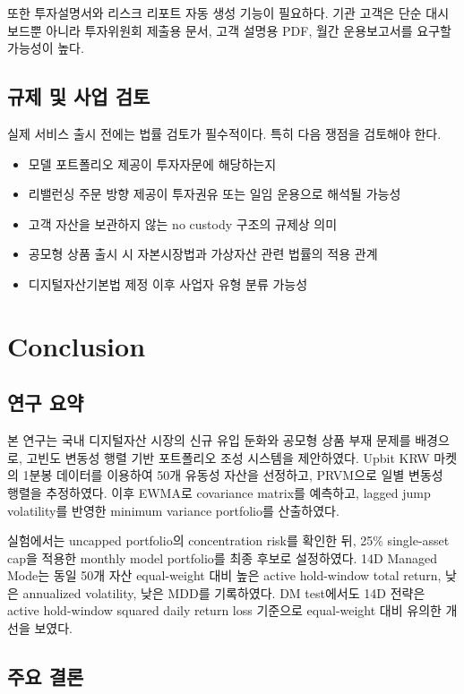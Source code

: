 \documentclass[12pt,a4paper]{article}
\begin{document}
또한 투자설명서와 리스크 리포트 자동 생성 기능이 필요하다. 기관 고객은 단순 대시보드뿐 아니라 투자위원회 제출용 문서, 고객 설명용 PDF, 월간 운용보고서를 요구할 가능성이 높다.

\subsection{규제 및 사업 검토}

실제 서비스 출시 전에는 법률 검토가 필수적이다. 특히 다음 쟁점을 검토해야 한다.

\begin{itemize}
\item 모델 포트폴리오 제공이 투자자문에 해당하는지
\item 리밸런싱 주문 방향 제공이 투자권유 또는 일임 운용으로 해석될 가능성
\item 고객 자산을 보관하지 않는 no custody 구조의 규제상 의미
\item 공모형 상품 출시 시 자본시장법과 가상자산 관련 법률의 적용 관계
\item 디지털자산기본법 제정 이후 사업자 유형 분류 가능성
\end{itemize}


\section{Conclusion}

\subsection{연구 요약}

본 연구는 국내 디지털자산 시장의 신규 유입 둔화와 공모형 상품 부재 문제를 배경으로, 고빈도 변동성 행렬 기반 포트폴리오 조성 시스템을 제안하였다. Upbit KRW 마켓의 1분봉 데이터를 이용하여 50개 유동성 자산을 선정하고, PRVM으로 일별 변동성 행렬을 추정하였다. 이후 EWMA로 covariance matrix를 예측하고, lagged jump volatility를 반영한 minimum variance portfolio를 산출하였다.

실험에서는 uncapped portfolio의 concentration risk를 확인한 뒤, 25\% single-asset cap을 적용한 monthly model portfolio를 최종 후보로 설정하였다. 14D Managed Mode는 동일 50개 자산 equal-weight 대비 높은 active hold-window total return, 낮은 annualized volatility, 낮은 MDD를 기록하였다. DM test에서도 14D 전략은 active hold-window squared daily return loss 기준으로 equal-weight 대비 유의한 개선을 보였다.

\subsection{주요 결론}
\end{document}
